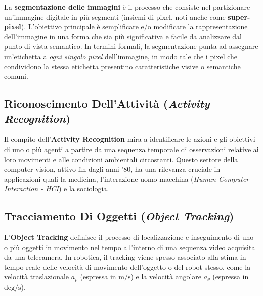 ﻿\documentclass[11pt, a4paper]{article}
\begin{document}
La \textbf{segmentazione delle immagini} è il processo che consiste nel partizionare un'immagine digitale in più segmenti (insiemi di pixel, noti anche come \textbf{super-pixel}). L'obiettivo principale è semplificare e/o modificare la rappresentazione dell'immagine in una forma che sia più significativa e facile da analizzare dal punto di vista semantico.
In termini formali, la segmentazione punta ad assegnare un'etichetta a \emph{ogni singolo pixel} dell'immagine, in modo tale che i pixel che condividono la stessa etichetta presentino caratteristiche visive o semantiche comuni.


\subsection{Riconoscimento Dell'Attività (\emph{Activity Recognition})}

Il compito dell'\textbf{Activity Recognition} mira a identificare le azioni e gli obiettivi di uno o più agenti a partire da una sequenza temporale di osservazioni relative ai loro movimenti e alle condizioni ambientali circostanti. Questo settore della computer vision, attivo fin dagli anni '80, ha una rilevanza cruciale in applicazioni quali la medicina, l'interazione uomo-macchina (\emph{Human-Computer Interaction - HCI}) e la sociologia.


\subsection{Tracciamento Di Oggetti (\emph{Object Tracking})}

L'\textbf{Object Tracking} definisce il processo di localizzazione e inseguimento di uno o più oggetti in movimento nel tempo all'interno di una sequenza video acquisita da una telecamera. In robotica, il tracking viene spesso associato alla stima in tempo reale delle velocità di movimento dell'oggetto o del robot stesso, come la velocità traslazionale $a_p$ (espressa in $\text{m/s}$) e la velocità angolare $a_{\theta}$ (espressa in $\text{deg/s}$).
\end{document}
